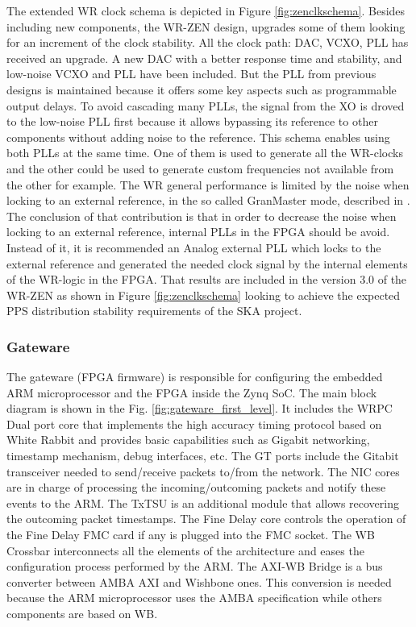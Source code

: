 The extended WR clock schema is depicted in Figure \ref{fig:zenclkschema}. 
Besides including new components, the WR-ZEN design, upgrades some of them 
looking for an increment of the clock stability. All the clock path: DAC, VCXO, 
PLL has received an upgrade. A new DAC with a better response time and 
stability, and low-noise VCXO and PLL have been included. But the PLL from 
previous designs is maintained because it offers some key aspects such as 
programmable output delays. To avoid cascading many PLLs, the signal from the 
XO is droved to the low-noise PLL first because it allows bypassing its 
reference to other components without adding noise to the reference. This 
schema enables using both PLLs at the same time. One of them is used to 
generate all the WR-clocks and the other could be used to generate custom 
frequencies not available from the other for example. The WR general 
performance is limited by the noise when locking to an external reference, in 
the so called GranMaster mode, described in \cite{Rizzi2016}. The conclusion of 
that contribution is that in order to decrease the noise when locking to an 
external reference, internal PLLs in the FPGA should be avoid. Instead of it, 
it is recommended an Analog external PLL which locks to the external reference 
and generated the needed clock signal by the internal elements of the WR-logic 
in the FPGA. That results are included in the version 3.0 of the WR-ZEN as 
shown in Figure \ref{fig:zenclkschema} looking to achieve the expected PPS 
distribution stability requirements of the SKA project.


\subsubsection{Gateware}
\label{subsec:gateware}

The gateware (FPGA firmware) is responsible for configuring the embedded ARM microprocessor and the FPGA inside the Zynq SoC. The main block diagram is shown in the Fig. \ref{fig:gateware_first_level}. It includes the WRPC Dual port core that implements the high accuracy timing protocol based on White Rabbit and provides basic capabilities such as Gigabit networking, timestamp mechanism, debug interfaces, etc. The GT ports include the Gitabit transceiver needed to send/receive packets to/from the network. The NIC cores are in charge of processing the incoming/outcoming packets and notify these events to the ARM. The TxTSU is an additional module that allows recovering the outcoming packet timestamps. The Fine Delay core controls the operation of the Fine Delay FMC card if any is plugged into the FMC socket. The WB Crossbar interconnects all the elements of the architecture and eases the configuration process performed by the ARM. The AXI-WB Bridge is a bus converter between AMBA AXI and Wishbone ones. This conversion is needed because the ARM microprocessor uses the AMBA specification while others components are based on WB.

